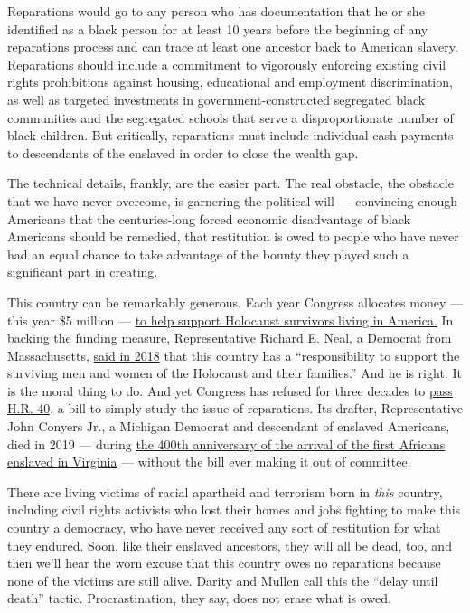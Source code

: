Reparations would go to any person who has documentation that he or she
identified as a black person for at least 10 years before the beginning
of any reparations process and can trace at least one ancestor back to
American slavery. Reparations should include a commitment to vigorously
enforcing existing civil rights prohibitions against housing,
educational and employment discrimination, as well as targeted
investments in government-constructed segregated black communities and
the segregated schools that serve a disproportionate number of black
children. But critically, reparations must include individual cash
payments to descendants of the enslaved in order to close the wealth
gap.

The technical details, frankly, are the easier part. The real obstacle,
the obstacle that we have never overcome, is garnering the political
will --- convincing enough Americans that the centuries-long forced
economic disadvantage of black Americans should be remedied, that
restitution is owed to people who have never had an equal chance to take
advantage of the bounty they played such a significant part in creating.

This country can be remarkably generous. Each year Congress allocates
money --- this year \$5 million ---
\href{https://www.govinfo.gov/content/pkg/CREC-2019-12-17/pdf/CREC-2019-12-17-house-bk3.pdf\#page=19}{to
help support Holocaust survivors living in America.} In backing the
funding measure, Representative Richard E. Neal, a Democrat from
Massachusetts,
\href{https://neal.house.gov/media-center/press-releases/statement-congressman-richard-neal-holocaust-remembrance-day}{said
in 2018} that this country has a ``responsibility to support the
surviving men and women of the Holocaust and their families.'' And he is
right. It is the moral thing to do. And yet Congress has refused for
three decades to
\href{https://www.congress.gov/bill/116th-congress/house-bill/40}{pass
H.R. 40,} a bill to simply study the issue of reparations. Its drafter,
Representative John Conyers Jr., a Michigan Democrat and descendant of
enslaved Americans, died in 2019 --- during
\href{https://www.nytimes3xbfgragh.onion/interactive/2019/08/14/magazine/1619-america-slavery.html?mtrref=www.google.com\&assetType=REGIWALL}{the
400th anniversary of the arrival of the first Africans enslaved in
Virginia} --- without the bill ever making it out of committee.

There are living victims of racial apartheid and terrorism born in
\emph{this} country, including civil rights activists who lost their
homes and jobs fighting to make this country a democracy, who have never
received any sort of restitution for what they endured. Soon, like their
enslaved ancestors, they will all be dead, too, and then we'll hear the
worn excuse that this country owes no reparations because none of the
victims are still alive. Darity and Mullen call this the ``delay until
death'' tactic. Procrastination, they say, does not erase what is owed.

